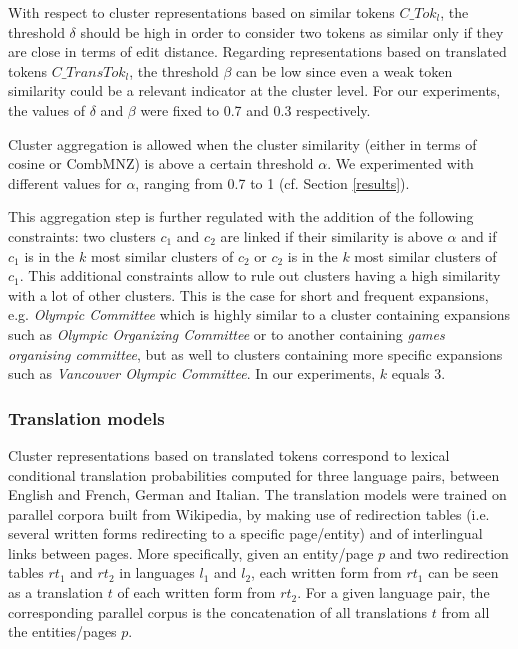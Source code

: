 \documentclass[output=paper]{langsci/langscibook}
\begin{document}
With respect to cluster representations based on similar tokens
$C\_Tok_{l}$, the threshold $\delta$ should be high in order to
consider two tokens as similar only if they are close in terms of edit
distance. Regarding representations based on translated tokens
$C\_TransTok_{l}$, the threshold $\beta$ can be low since even a weak
token similarity could be a relevant indicator at the cluster
level. For our experiments, the values of $\delta$ and $\beta$ were
fixed to 0.7 and 0.3 respectively.

Cluster aggregation is allowed when the cluster similarity (either in terms of cosine or
CombMNZ) is above a certain threshold $\alpha$. We experimented with
different values for $\alpha$, ranging from 0.7 to 1 (cf. Section
\ref{results}).

This aggregation step is further regulated with the addition of the
following constraints: two clusters $c_1$ and $c_2$ are linked if
their similarity is above $\alpha$ and if $c_1$ is in the $k$ most
similar clusters of $c_2$ or $c_2$ is in the $k$ most similar clusters
of $c_1$. This additional constraints allow to rule out clusters
having a high similarity with a lot of other clusters.  This is the
case for short and frequent expansions, e.g. \textit{Olympic
  Committee} which is highly similar to a cluster containing
expansions such as \textit{Olympic Organizing Committee} or to another
containing \textit{games organising committee}, but as well to
clusters containing more specific expansions such as \textit{Vancouver
  Olympic Committee}. In our experiments, $k$ equals 3.


\subsubsection{Translation models}
\label{trans}
Cluster representations based on translated tokens correspond to
lexical conditional translation probabilities computed for three
language pairs, between English and French, German and Italian. The
translation models were trained on parallel corpora built from
Wikipedia, by making use of redirection tables (i.e. several written
forms redirecting to a specific page/entity) and of interlingual links
between pages.  More specifically, given an entity/page $p$ and two
redirection tables $rt_1$ and $rt_2$ in languages $l_1$ and $l_2$,
each written form from $rt_1$ can be seen as a translation $t$ of each
written form from $rt_2$. For a given language pair, the corresponding
parallel corpus is the concatenation of all translations $t$ from all
the entities/pages $p$.
\end{document}
